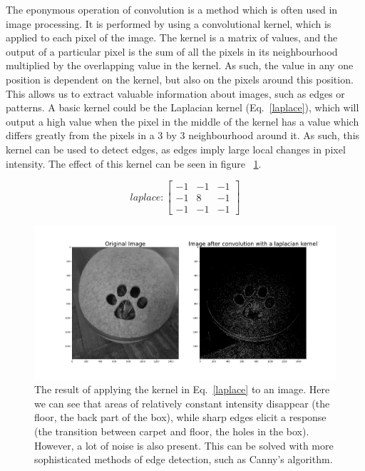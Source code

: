\documentclass[onecolumn,10pt,cleanfoot]{asme2ej}
\begin{document}
The eponymous operation of convolution is a method which is often used in image processing. It is performed by using a convolutional kernel, which is applied to each pixel of the image. The kernel is a matrix of values, and the output of a particular pixel is the sum of all the pixels in its neighbourhood multiplied by the overlapping value in the kernel. As such, the value in any one position is dependent on the kernel, but also on the pixels around this position. This allows us to extract valuable information about images, such as edges or patterns. A basic kernel could be the Laplacian kernel (Eq.~\ref{laplace}), which will output a high value when the pixel in the middle of the kernel has a value which differs greatly from the pixels in a 3 by 3 neighbourhood around it. As such, this kernel can be used to detect edges, as edges imply large local changes in pixel intensity. The effect of this kernel can be seen in figure ~\ref{millie}.

\begin{equation}
\label{laplace}
laplace : 
\begin{bmatrix}
-1 & -1 & -1 \\
-1 & 8 & -1 \\
-1 & -1 & -1
\end{bmatrix}
\end{equation}

\begin{figure}[H]
\centerline{\includegraphics[width=8in]{figure/millie.png}}
\caption{The result of applying the kernel in Eq.~\ref{laplace} to an image. Here we can see that areas of relatively constant intensity disappear (the floor, the back part of the box), while sharp edges elicit a response (the transition between carpet and floor, the holes in the box). However, a lot of noise is also present. This can be solved with more sophisticated methods of edge detection, such as Canny's algorithm.}
\label{millie}
\end{figure}
\end{document}
